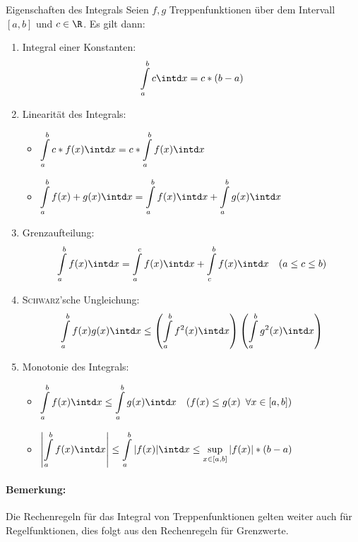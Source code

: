 \begin{satz}{Eigenschaften des Integrals}
	Seien $f,g$ Treppenfunktionen über dem Intervall $[a,b]$ und $c\in\R$. Es gilt dann:
	\begin{enumerate}
		\item Integral einer Konstanten:
		\begin{equation*}
			\int\limits_a^b c\intd x = c*(b-a)
		\end{equation*}
		\item Linearität des Integrals:
		\begin{itemize}
			\item $\displaystyle\int\limits_a^b c*f(x)\intd x=c*\int\limits_a^b f(x)\intd x$
			\item $\displaystyle\int\limits_a^b f(x)+g(x) \intd x = \int\limits_a^b f(x) \intd x+\int\limits_a^b g(x) \intd x$
		\end{itemize}
		\item Grenzaufteilung:
		\begin{equation*}
			\int\limits_a^b f(x)\intd x=\int\limits_a^c f(x)\intd x+\int\limits_c^b f(x)\intd x \quad (a\leq c\leq b)
		\end{equation*}
		\item \textsc{Schwarz}'sche Ungleichung:
		\begin{equation*}
			\int\limits_a^b f(x)g(x)\intd x
				\leq \left(\int\limits_a^b f^2(x)\intd x\right)\left(\int\limits_a^b g^2(x)\intd x\right)
		\end{equation*}
		\item Monotonie des Integrals:
		\begin{itemize}
			\item $\displaystyle\int\limits_a^b f(x)\intd x\leq \int\limits_a^b g(x)\intd x \quad (f(x)\leq g(x) \enspace\forall x\in[a,b])$
			\item $\displaystyle\left|\int\limits_a^b f(x)\intd x\right|\leq \int\limits_a^b |f(x)|\intd x\leq \sup_{x\in[a,b]}|f(x)|*(b-a)$
		\end{itemize}
	\end{enumerate}
\end{satz}
\paragraph{Bemerkung:}
Die Rechenregeln für das Integral von Treppenfunktionen gelten weiter auch für Regelfunktionen, dies folgt aus den Rechenregeln für Grenzwerte.

\medskip

